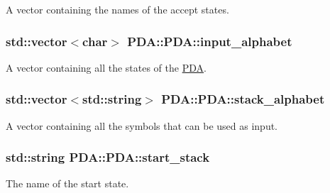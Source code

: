 \-A vector containing the names of the accept states. 

\hypertarget{classPDA_1_1PDA_a54db260eece0bfe0d5aad0ef13f18a02}{
\subsubsection[{input\-\_\-alphabet}]{\setlength{\rightskip}{0pt plus 5cm}std\-::vector$<$char$>$ {\bf \-P\-D\-A\-::\-P\-D\-A\-::input\-\_\-alphabet}}}\label{d1/dc5/classPDA_1_1PDA_a54db260eece0bfe0d5aad0ef13f18a02}


\-A vector containing all the states of the \hyperlink{classPDA_1_1PDA}{\-P\-D\-A}. 

\hypertarget{classPDA_1_1PDA_a90a4f96e28003d5bfa4d67b4c7a191b5}{
\subsubsection[{stack\-\_\-alphabet}]{\setlength{\rightskip}{0pt plus 5cm}std\-::vector$<$std\-::string$>$ {\bf \-P\-D\-A\-::\-P\-D\-A\-::stack\-\_\-alphabet}}}\label{d1/dc5/classPDA_1_1PDA_a90a4f96e28003d5bfa4d67b4c7a191b5}


\-A vector containing all the symbols that can be used as input. 

\hypertarget{classPDA_1_1PDA_a253c02338c616cd8e8882f71e2a5666f}{
\subsubsection[{start\-\_\-stack}]{\setlength{\rightskip}{0pt plus 5cm}std\-::string {\bf \-P\-D\-A\-::\-P\-D\-A\-::start\-\_\-stack}}}\label{d1/dc5/classPDA_1_1PDA_a253c02338c616cd8e8882f71e2a5666f}


\-The name of the start state. 

